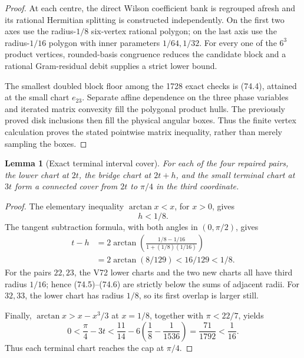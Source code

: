 \documentclass[11pt,oneside]{article}
\newtheorem{lemma}[theorem]{Lemma}
\theoremstyle{definition}
\theoremstyle{remark}
\begin{document}
\begin{proof}
At each centre, the direct Wilson coefficient bank is regrouped
afresh and its rational Hermitian splitting is constructed
independently.  On the first two axes use the radius-\(1/8\)
six-vertex rational polygon; on the last axis use the radius-\(1/16\)
polygon with inner parameters \(1/64,1/32\).  For every one of the
\(6^3\) product vertices, rounded-basis congruence reduces the
candidate block and a rational Gram-residual debit supplies a
strict lower bound.

The smallest doubled block floor among the 1728 exact checks is
(74.4), attained at the small chart \(e_{23}\).  Separate affine
dependence on the three phase variables and iterated matrix
convexity fill the polygonal product hulls.  The previously proved
disk inclusions then fill the physical angular boxes.  Thus the
finite vertex calculation proves the stated pointwise matrix
inequality, rather than merely sampling the boxes.
\end{proof}

\begin{lemma}[Exact terminal interval cover]
\label{lem:newv74-terminal-cover}
For each of the four repaired pairs, the lower chart at \(2t\), the
bridge chart at \(2t+h\), and the small terminal chart at \(3t\)
form a connected cover from \(2t\) to \(\pi/4\) in the third
coordinate.
\end{lemma}

\begin{proof}
The elementary inequality \(\arctan x<x\), for \(x>0\), gives
\[
 h<1/8.                                                 \tag{74.5}
\]
The tangent subtraction formula, with both angles in
\((0,\pi/2)\), gives
\[
\begin{split}
 t-h
 &=2\arctan\!\left(
     \frac{1/8-1/16}{1+(1/8)(1/16)}\right)\\
 &=2\arctan(8/129)<16/129<1/8.
\end{split}                                            \tag{74.6}
\]
For the pairs \(22,23\), the V72 lower charts and the two new charts
all have third radius \(1/16\); hence (74.5)--(74.6) are strictly
below the sums of adjacent radii.  For \(32,33\), the lower chart
has radius \(1/8\), so its first overlap is larger still.

Finally, \(\arctan x>x-x^3/3\) at \(x=1/8\), together with
\(\pi<22/7\), yields
\[
 0<\frac{\pi}{4}-3t
 <\frac{11}{14}-6\left(\frac18-\frac1{1536}\right)
 =\frac{71}{1792}<\frac1{16}.                          \tag{74.7}
\]
Thus each terminal chart reaches the cap at \(\pi/4\).
\end{proof}
\end{document}
